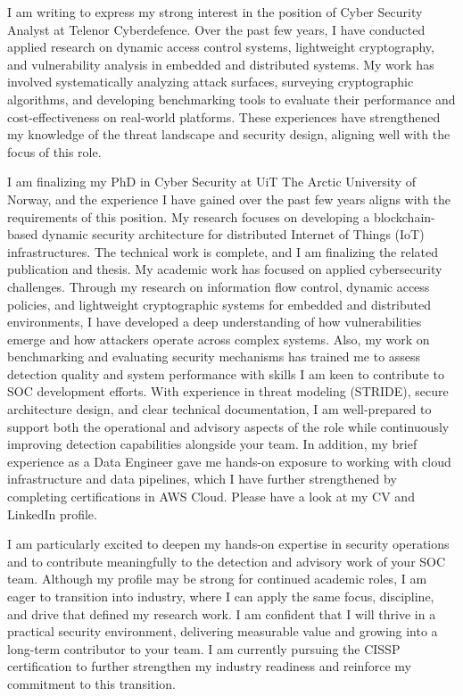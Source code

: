 I am writing to express my strong interest in the position of Cyber Security Analyst at Telenor Cyberdefence. Over the past few years, I have conducted applied research on dynamic access control systems, lightweight cryptography, and vulnerability analysis in embedded and distributed systems. My work has involved systematically analyzing attack surfaces, surveying cryptographic algorithms, and developing benchmarking tools to evaluate their performance and cost-effectiveness on real-world platforms. These experiences have strengthened my knowledge of the threat landscape and security design, aligning well with the focus of this role.

I am finalizing my PhD in Cyber Security at UiT The Arctic University of Norway, and the experience I have gained over the past few years aligns with the requirements of this position. My research focuses on developing a blockchain-based dynamic security architecture for distributed Internet of Things (IoT) infrastructures. The technical work is complete, and I am finalizing the related publication and thesis. My academic work has focused on applied cybersecurity challenges. Through my research on information flow control, dynamic access policies, and lightweight cryptographic systems for embedded and distributed environments, I have developed a deep understanding of how vulnerabilities emerge and how attackers operate across complex systems. Also, my work on benchmarking and evaluating security mechanisms has trained me to assess detection quality and system performance with skills I am keen to contribute to SOC development efforts. With experience in threat modeling (STRIDE), secure architecture design, and clear technical documentation, I am well-prepared to support both the operational and advisory aspects of the role while continuously improving detection capabilities alongside your team. In addition, my brief experience as a Data Engineer gave me hands-on exposure to working with cloud infrastructure and data pipelines, which I have further strengthened by completing certifications in AWS Cloud. Please have a look at my CV and LinkedIn profile.


I am particularly excited to deepen my hands-on expertise in security operations and to contribute meaningfully to the detection and advisory work of your SOC team. Although my profile may be strong for continued academic roles, I am eager to transition into industry, where I can apply the same focus, discipline, and drive that defined my research work. I am confident that I will thrive in a practical security environment, delivering measurable value and growing into a long-term contributor to your team. I am currently pursuing the CISSP certification to further strengthen my industry readiness and reinforce my commitment to this transition.
